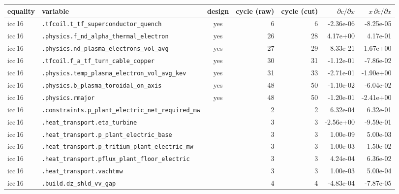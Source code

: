 \begin{tabular}{llcrrrr}
\toprule
equality & variable & design & cycle (raw) & cycle (cut) & $\partial c/\partial x$ & $x\,\partial c/\partial x$ \\
\midrule
icc\,16 & \texttt{.tfcoil.t\_tf\_superconductor\_quench} & yes & 6 & 6 & -2.36e-06 & -8.25e-05 \\
icc\,16 & \texttt{.physics.f\_nd\_alpha\_thermal\_electron} & yes & 26 & 28 & 4.17e+00 & 4.17e-01 \\
icc\,16 & \texttt{.physics.nd\_plasma\_electrons\_vol\_avg} & yes & 27 & 29 & -8.33e-21 & -1.67e+00 \\
icc\,16 & \texttt{.tfcoil.f\_a\_tf\_turn\_cable\_copper} & yes & 30 & 31 & -1.12e-01 & -7.86e-02 \\
icc\,16 & \texttt{.physics.temp\_plasma\_electron\_vol\_avg\_kev} & yes & 31 & 33 & -2.71e-01 & -1.90e+00 \\
icc\,16 & \texttt{.physics.b\_plasma\_toroidal\_on\_axis} & yes & 48 & 50 & -1.10e-02 & -6.04e-02 \\
icc\,16 & \texttt{.physics.rmajor} & yes & 48 & 50 & -1.20e-01 & -2.41e+00 \\
icc\,16 & \texttt{.constraints.p\_plant\_electric\_net\_required\_mw} &  & 2 & 2 & 6.32e-04 & 6.32e-01 \\
icc\,16 & \texttt{.heat\_transport.eta\_turbine} &  & 3 & 3 & -2.56e+00 & -9.59e-01 \\
icc\,16 & \texttt{.heat\_transport.p\_plant\_electric\_base} &  & 3 & 3 & 1.00e-09 & 5.00e-03 \\
icc\,16 & \texttt{.heat\_transport.p\_tritium\_plant\_electric\_mw} &  & 3 & 3 & 1.00e-03 & 1.50e-02 \\
icc\,16 & \texttt{.heat\_transport.pflux\_plant\_floor\_electric} &  & 3 & 3 & 4.24e-04 & 6.36e-02 \\
icc\,16 & \texttt{.heat\_transport.vachtmw} &  & 3 & 3 & 1.00e-03 & 5.00e-04 \\
icc\,16 & \texttt{.build.dz\_shld\_vv\_gap} &  & 4 & 4 & -4.83e-04 & -7.87e-05 \\

\end{tabular}
